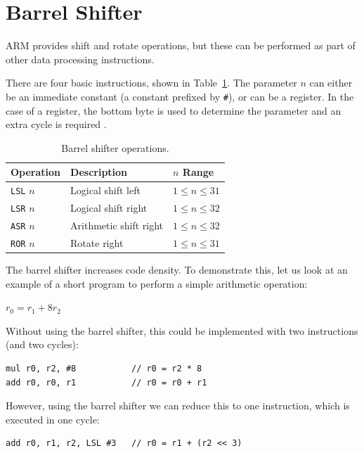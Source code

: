 \documentclass[oneside,a4paper]{report}
\begin{document}
\section{Barrel Shifter}\label{sec:barrelshifter}
ARM provides shift and rotate operations, but these can be performed as part of other data processing instructions.

There are four basic instructions, shown in Table~\ref{tab:shifts}. The parameter $n$ can either be an immediate constant (a constant prefixed by \texttt{\#}), or can be a register. In the case of a register, the bottom byte is used to determine the parameter and an extra cycle is required \cite[p. 31]{ARMInst}.

\begin{table}[htb]
	\centering
	\begin{tabular}{lll}
		\toprule
		Operation		&	Description				&	$n$ Range		\\
		\midrule
		\texttt{LSL}	$n$			&	Logical shift left		&	$1 \le n \le 31$	\\
		\texttt{LSR}	$n$			&	Logical shift right		&	$1 \le n \le 32$	\\
		\texttt{ASR}	$n$			&	Arithmetic shift right	&	$1 \le n \le 32$	\\
		\texttt{ROR}	$n$			&	Rotate right			&	$1 \le n \le 31$	\\
		\bottomrule
	\end{tabular}
	\caption{Barrel shifter operations. \cite[p. A8-10]{ARMRef}}
	\label{tab:shifts}
\end{table}

The barrel shifter increases code density. To demonstrate this, let us look at an example of a short program to perform a simple arithmetic operation:

$r_0 = r_1 + 8r_2$

Without using the barrel shifter, this could be implemented with two instructions (and two cycles):

\begin{lstlisting}[language={[ARM]Assembler}]
mul r0, r2, #8           // r0 = r2 * 8
add r0, r0, r1           // r0 = r0 + r1
\end{lstlisting}

However, using the barrel shifter we can reduce this to one instruction, which is executed in one cycle:

\begin{lstlisting}[language={[ARM]Assembler}]
add r0, r1, r2, LSL #3   // r0 = r1 + (r2 << 3)
\end{lstlisting}
\end{document}

